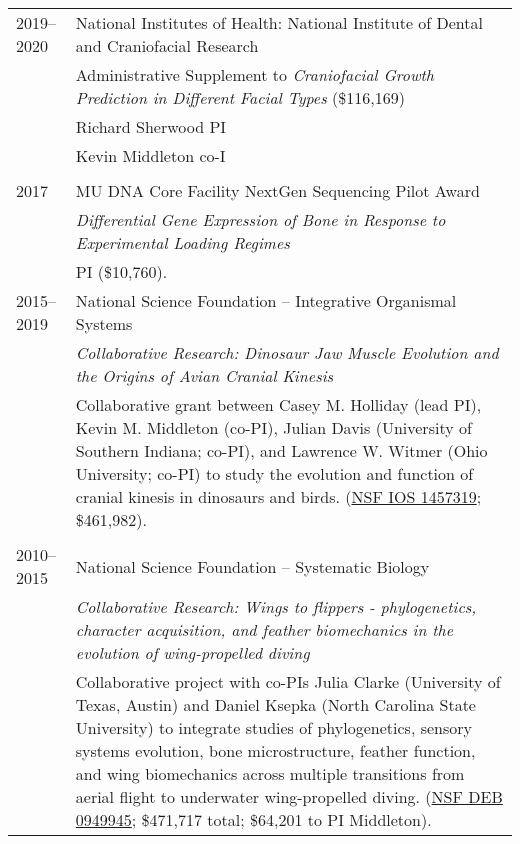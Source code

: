 \begin{longtable}{@{}lX@{}}
    2019--2020 & National Institutes of Health: National Institute of Dental and Craniofacial Research\\
         & Administrative Supplement to \emph{Craniofacial Growth Prediction in Different Facial Types} (\$116,169)\\
         & Richard Sherwood PI\\
         & Kevin Middleton co-I\\
         \\
    2017 & MU DNA Core Facility NextGen Sequencing Pilot Award\\
    & \emph{Differential Gene Expression of Bone in Response to Experimental Loading Regimes}\\
    & PI (\$10,760).\\
    2015--2019 & National Science Foundation -- Integrative Organismal Systems\\
    & \emph{Collaborative Research: Dinosaur Jaw Muscle Evolution and the Origins of Avian Cranial Kinesis}\\[0.5pc]
    & Collaborative grant between Casey M. Holliday (lead PI), Kevin M. Middleton (co-PI), Julian Davis (University of Southern Indiana; co-PI), and Lawrence W. Witmer (Ohio University; co-PI) to study the evolution and function of cranial kinesis in dinosaurs and birds. (\href{https://www.nsf.gov/awardsearch/showAward?AWD_ID=1457319}{NSF IOS 1457319}; \$461,982).\\
    \\
    2010--2015 & National Science Foundation -- Systematic Biology\\
    & \textit{Collaborative Research: Wings to flippers - phylogenetics, character acquisition, and feather biomechanics in the evolution of wing-propelled diving}\\[0.5pc]
    & Collaborative project with co-PIs Julia Clarke (University of Texas, Austin) and Daniel Ksepka (North Carolina State University) to integrate studies of phylogenetics, sensory systems evolution, bone microstructure, feather function, and wing biomechanics across multiple transitions from aerial flight to underwater wing-propelled diving. (\href{http://www.nsf.gov/awardsearch/showAward.do?AwardNumber=0949945}{NSF DEB 0949945}; \$471,717 total; \$64,201 to PI Middleton).\\

\end{longtable}
